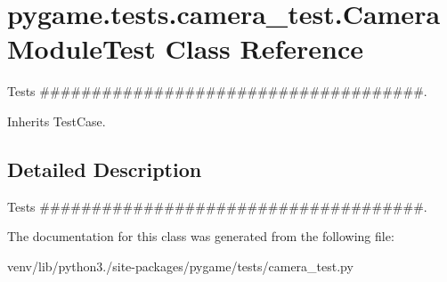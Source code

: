 \hypertarget{classpygame_1_1tests_1_1camera__test_1_1_camera_module_test}{}\section{pygame.\+tests.\+camera\+\_\+test.\+Camera\+Module\+Test Class Reference}
\label{classpygame_1_1tests_1_1camera__test_1_1_camera_module_test}


Tests \#\#\#\#\#\#\#\#\#\#\#\#\#\#\#\#\#\#\#\#\#\#\#\#\#\#\#\#\#\#\#\#\#\#\#\#\#.  




Inherits Test\+Case.



\subsection{Detailed Description}
Tests \#\#\#\#\#\#\#\#\#\#\#\#\#\#\#\#\#\#\#\#\#\#\#\#\#\#\#\#\#\#\#\#\#\#\#\#\#. 

The documentation for this class was generated from the following file\+:\begin{DoxyCompactItemize}
\item 
venv/lib/python3./site-\/packages/pygame/tests/camera\+\_\+test.\+py\end{DoxyCompactItemize}

